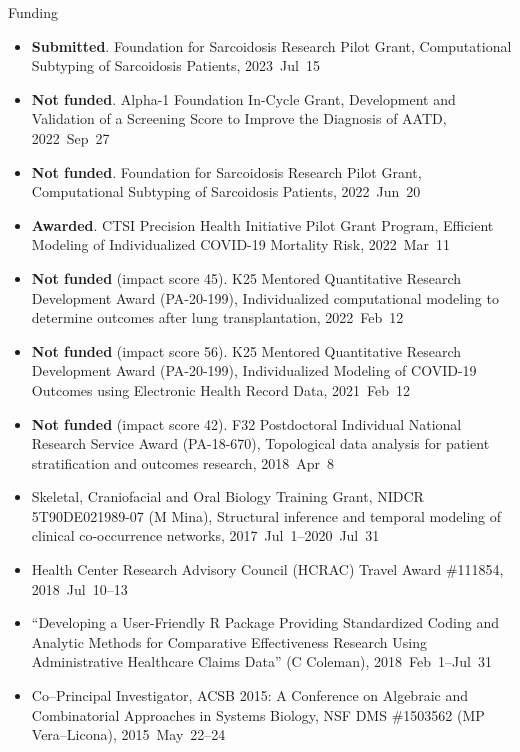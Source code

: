 \documentclass[10pt,a4paper]{article}
\begin{document}
\vspace{.25cm}
{\sc Funding}
\begin{itemize}[label=$\circ$,nolistsep]
\item
{\bfseries Submitted}. Foundation for Sarcoidosis Research Pilot Grant, Computational Subtyping of Sarcoidosis Patients, 2023~Jul~15
\item
{\bfseries Not funded}. Alpha-1 Foundation In-Cycle Grant, Development and Validation of a Screening Score to Improve the Diagnosis of AATD, 2022~Sep~27
\item
{\bfseries Not funded}. Foundation for Sarcoidosis Research Pilot Grant, Computational Subtyping of Sarcoidosis Patients, 2022~Jun~20
\item
{\bfseries Awarded}. CTSI Precision Health Initiative Pilot Grant Program, Efficient Modeling of Individualized COVID-19 Mortality Risk, 2022~Mar~11
\item
{\bfseries Not funded} (impact score 45). K25 Mentored Quantitative Research Development Award (PA-20-199), Individualized computational modeling to determine outcomes after lung transplantation, 2022~Feb~12
\item
{\bfseries Not funded} (impact score 56). K25 Mentored Quantitative Research Development Award (PA-20-199), Individualized Modeling of COVID-19 Outcomes using Electronic Health Record Data, 2021~Feb~12
\item
{\bfseries Not funded} (impact score 42). F32 Postdoctoral Individual National Research Service Award (PA-18-670), Topological data analysis for patient stratification and outcomes
research, 2018~Apr~8
\item
Skeletal, Craniofacial and Oral Biology Training Grant, NIDCR 5T90DE021989-07 (M Mina), Structural inference and temporal modeling of clinical co-occurrence networks, 2017~Jul~1--2020~Jul~31
\item
Health Center Research Advisory Council (HCRAC) Travel Award \#111854, 2018~Jul~10--13
\item
``Developing a User-Friendly R Package Providing Standardized Coding and Analytic Methods for Comparative Effectiveness Research Using Administrative Healthcare Claims Data'' (C Coleman), 2018~Feb~1--Jul~31
\item
Co--Principal Investigator, ACSB 2015: A Conference on Algebraic and Combinatorial Approaches in Systems Biology, NSF DMS \#1503562 (MP Vera--Licona), 2015~May~22--24
\end{itemize}
\end{document}
